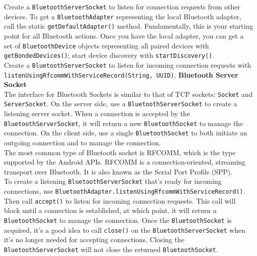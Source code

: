 \hspace*{0.82cm}Create a \texttt{BluetoothServerSocket} to listen for connection requests from other devices. 
To get a \texttt{BluetoothAdapter} representing the local Bluetooth adapter, call the static \texttt{getDefaultAdapter()} method. 
Fundamentally, this is your starting point for all Bluetooth actions. Once you have the local adapter, you can get a set of 
\texttt{BluetoothDevice} objects representing all paired devices with \texttt{getBondedDevices()}; start device discovery with 
\texttt{startDiscovery()}.\\[0.5cm]
\hspace*{0.82cm}Create a \texttt{BluetoothServerSocket} to listen for incoming connection requests with 
\texttt{listenUsingRfcommWithServiceRecord(String, UUID)}.
\newpage
\textbf{Bluetooth Server Socket}\\
\hspace*{0.82cm}The interface for Bluetooth Sockets is similar to that of TCP sockets: \texttt{Socket} and \texttt{ServerSocket}. On the 
server side, use a \texttt{BluetoothServerSocket} to create a listening server socket. When a connection is accepted by the 
\texttt{BluetoothServerSocket}, it will return a new \texttt{BluetoothSocket} to manage the connection. On the client side, use a single 
\texttt{BluetoothSocket} to both initiate an outgoing connection and to manage the connection.\\[0.5cm]
\hspace*{0.82cm}The most common type of Bluetooth socket is RFCOMM, which is the type supported by the Android APIs. RFCOMM is a 
connection-oriented, streaming transport over Bluetooth. It is also known as the Serial Port Profile (SPP).\\[0.5cm]
\hspace*{0.82cm}To create a listening \texttt{BluetoothServerSocket} that's ready for incoming connections,  use 
\texttt{BluetoothAdapter.listenUsingRfcommWithServiceRecord()}.\\Then call \texttt{accept()} to listen for incoming connection requests. 
This call will block until a connection is established, at which point, it will return a \texttt{BluetoothSocket} to manage the connection. 
Once the \texttt{BluetoothSocket} is acquired, it's a good idea to call \texttt{close()} on the \texttt{BluetoothServerSocket} when it's no 
longer needed for accepting connections. Closing the \texttt{BluetoothServerSocket} will not close the returned \texttt{BluetoothSocket}.\\[0.5cm]
